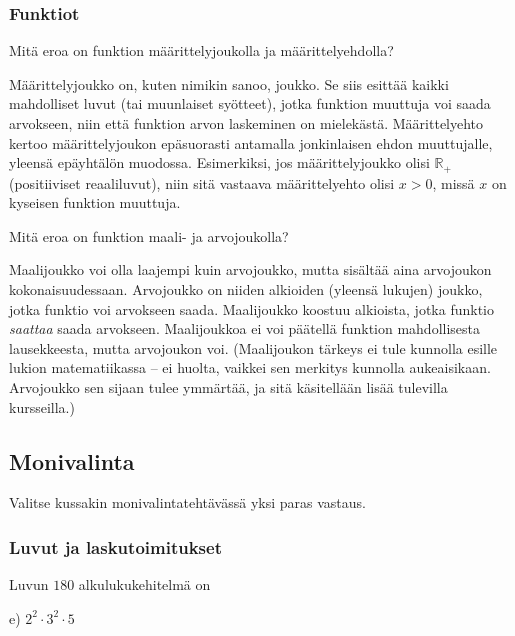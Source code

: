 \subsubsection*{Funktiot}

\begin{tehtava}
Mitä eroa on funktion määrittelyjoukolla ja määrittelyehdolla?
\begin{vastaus}
Määrittelyjoukko on, kuten nimikin sanoo, joukko. Se siis esittää kaikki mahdolliset luvut (tai muunlaiset syötteet), jotka funktion muuttuja voi saada arvokseen, niin että funktion arvon laskeminen on mielekästä. Määrittelyehto kertoo määrittelyjoukon epäsuorasti antamalla jonkinlaisen ehdon muuttujalle, yleensä epäyhtälön muodossa. Esimerkiksi, jos määrittelyjoukko olisi $\mathbb{R}_+$ (positiiviset reaaliluvut), niin sitä vastaava määrittelyehto olisi $x>0$, missä $x$ on kyseisen funktion muuttuja.
\end{vastaus}
\end{tehtava}

\begin{tehtava}
Mitä eroa on funktion maali- ja arvojoukolla?
	\begin{vastaus}
Maalijoukko voi olla laajempi kuin arvojoukko, mutta sisältää aina arvojoukon kokonaisuudessaan. Arvojoukko on niiden alkioiden (yleensä lukujen) joukko, jotka funktio voi arvokseen saada. Maalijoukko koostuu alkioista, jotka funktio \textit{saattaa} saada arvokseen. Maalijoukkoa ei voi päätellä funktion mahdollisesta lausekkeesta, mutta arvojoukon voi. (Maalijoukon tärkeys ei tule kunnolla esille lukion matematiikassa -- ei huolta, vaikkei sen merkitys kunnolla aukeaisikaan. Arvojoukko sen sijaan tulee ymmärtää, ja sitä käsitellään lisää tulevilla kursseilla.)
	\end{vastaus}
\end{tehtava}

\newpage
\subsection{Monivalinta}

Valitse kussakin monivalintatehtävässä yksi paras vastaus.

\subsubsection*{Luvut ja laskutoimitukset}

\begin{tehtava}
Luvun $180$ alkulukukehitelmä on
	\begin{vastaus}
	 e) $2^2\cdot3^2\cdot5$
	\end{vastaus}
\end{tehtava}

